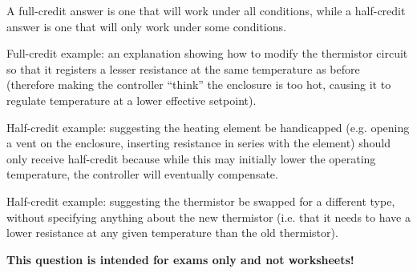 





A full-credit answer is one that will work under all conditions, while a half-credit answer is one that will only work under some conditions.

\vskip 10pt

Full-credit example: an explanation showing how to modify the thermistor circuit so that it registers a lesser resistance at the same temperature as before (therefore making the controller ``think'' the enclosure is too hot, causing it to regulate temperature at a lower effective setpoint).

Half-credit example: suggesting the heating element be handicapped (e.g. opening a vent on the enclosure, inserting resistance in series with the element) should only receive half-credit because while this may initially lower the operating temperature, the controller will eventually compensate.

Half-credit example: suggesting the thermistor be swapped for a different type, without specifying anything about the new thermistor (i.e. that it needs to have a lower resistance at any given temperature than the old thermistor).







{\bf This question is intended for exams only and not worksheets!}



